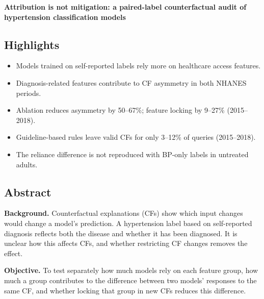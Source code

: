 \documentclass[
  11pt,
]{article}
\author{}
\date{}
\providecommand{\tightlist}{%
  \setlength{\itemsep}{0pt}\setlength{\parskip}{0pt}}
\begin{document}
\begin{flushleft}{\LARGE\bfseries Attribution is not mitigation: a paired-label counterfactual audit of hypertension classification models\par}\vspace{8pt}{\large Cong-Danh Tran\par}\end{flushleft}\vspace{4pt}

\subsection{Highlights}

\begin{itemize}
\tightlist
\item
  Models trained on self-reported labels rely more on healthcare access
  features.
\item
  Diagnosis-related features contribute to CF asymmetry in both NHANES
  periods.
\item
  Ablation reduces asymmetry by 50--67\%; feature locking by 9--27\%
  (2015--2018).
\item
  Guideline-based rules leave valid CFs for only 3--12\% of queries
  (2015--2018).
\item
  The reliance difference is not reproduced with BP-only labels in
  untreated adults.
\end{itemize}

\subsection{Abstract}

\textbf{Background.} Counterfactual explanations (CFs) show which input
changes would change a model's prediction. A hypertension label based on
self-reported diagnosis reflects both the disease and whether it has
been diagnosed. It is unclear how this affects CFs, and whether
restricting CF changes removes the effect.

\textbf{Objective.} To test separately how much models rely on each
feature group, how much a group contributes to the difference between
two models' responses to the same CF, and whether locking that group in
new CFs reduces this difference.
\end{document}
